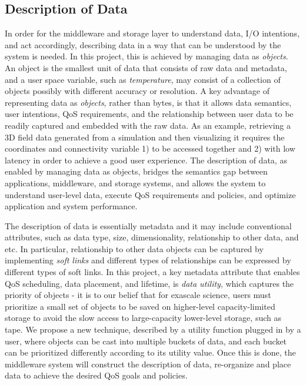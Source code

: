 \subsection{Description of Data}
In order for the middleware and storage layer to understand data,
I/O intentions, and act accordingly, describing data in a way that can
be understood by the system is needed. In this project, this is achieved 
by managing data as \textit{objects}.
An object is the smallest unit of data that consists of raw data and metadata,
and a user space variable, such as \textit{temperature}, may consist of a collection
of objects possibly with different accuracy or resolution.
A key advantage of representing data as \textit{objects}, rather than 
bytes, is that it allows data semantics, user intentions, QoS requirements, and
the relationship between user data to be readily captured and embedded with the 
raw data. As an example, retrieving a 3D field data generated from a simulation 
and then visualizing it requires the coordinates and connectivity variable 
1) to be accessed together and 2) with low latency in order to achieve a good user experience. 
The description of data, as enabled by managing data as objects, bridges 
the semantics gap between applications, middleware, and storage systems,
and allows the system to understand user-level data, execute QoS requirements and policies, and
optimize application and system performance.


The description of data is essentially metadata and it may include conventional attributes, such as 
data type, size, dimensionality, relationship to other data, and etc. In particular,
relationship to other data objects can be captured by implementing \textit{soft links}
and different types of relationships can be expressed by different types of soft links. 
In this project, a key metadata attribute
that enables QoS scheduling, data placement, and lifetime, is \textit{data utility}, which
captures the priority of objects - it is to our belief that
for exascale science, users must prioritize a small set of objects to be saved on 
higher-level capacity-limited storage 
to avoid the slow access to large-capacity lower-level storage, such as tape.
We propose a new technique, described by a utility function plugged in by a user, 
where objects can be cast into multiple buckets of data, and each bucket can be prioritized 
differently according to its utility value.
Once this is done, the middleware system will construct the description of data, re-organize
and place data to achieve the desired QoS goals and policies.

